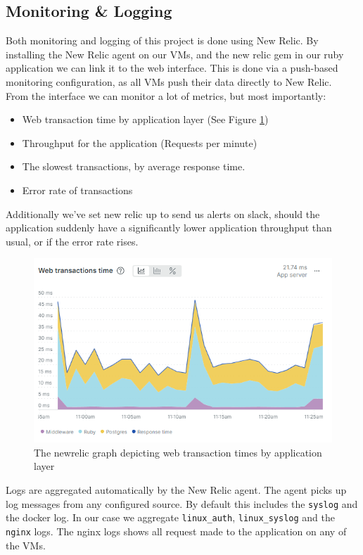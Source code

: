 \documentclass{article}
\begin{document}
\subsection{Monitoring \& Logging}
Both monitoring and logging of this project is done using New Relic. By installing the New Relic agent on our VMs, and the new relic gem in our ruby application we can link it to the web interface. This is done via a push-based monitoring configuration, as all VMs push their data directly to New Relic. 
\\From the interface we can monitor a lot of metrics, but most importantly:
\begin{itemize}
    \item Web transaction time by application layer (See Figure \ref{fig:transaction-times})
    \item Throughput for the application (Requests per minute) 
    \item The slowest transactions, by average response time.
    \item Error rate of transactions
\end{itemize}
Additionally we've set new relic up to send us alerts on slack, should the application suddenly have a significantly lower application throughput than usual, or if the error rate rises.
\begin{figure}[H]
    \centering
    \includegraphics[width=\textwidth]{images/new-relic-transactions.png}
    \caption{The newrelic graph depicting web transaction times by application layer}
    \label{fig:transaction-times}
\end{figure}

Logs are aggregated automatically by the New Relic agent. The agent picks up log messages from any configured source. By default this includes the \texttt{syslog} and the docker log. In our case we aggregate \texttt{linux\_auth}, \texttt{linux\_syslog} and the \texttt{nginx} logs. The nginx logs shows all request made to the application on any of the VMs.
\end{document}

